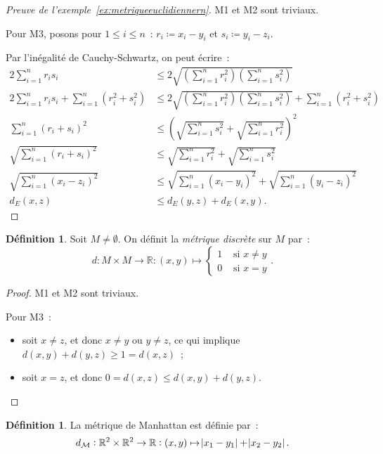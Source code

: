 \documentclass{report}
\theoremstyle{definition}
\newtheorem{déf}[thm]{Définition}
\theoremstyle{remark}
\newcommand{\R}{\mathbb R}
\begin{document}
		\begin{proof}[Preuve de l'exemple~\ref{ex:metriqueeuclidiennern}] M1 et M2 sont triviaux.

		Pour M3, posons pour $1 \leq i \leq n$~: $r_i \coloneqq x_i - y_i$ et $s_i \coloneqq y_i - z_i$.

		Par l'inégalité de Cauchy-Schwartz, on peut écrire~:
		\begin{align*}
			2\sum_{i=1}^nr_is_i &\leq 2\sqrt {\left(\sum_{i=1}^nr_i^2\right)\left(\sum_{i=1}^ns_i^2\right)} \\
			2\sum_{i=1}^nr_is_i + \sum_{i=1}^n(r_i^2+s_i^2) &\leq 2\sqrt{\left(\sum_{i=1}^nr_i^2\right)\left(\sum_{i=1}^ns_i^2\right)} + \sum_{i=1}^n(r_i^2+s_i^2) \\
			\sum_{i=1}^n(r_i+s_i)^2 &\leq \left(\sqrt {\sum_{i=1}^ns_i^2} + \sqrt {\sum_{i=1}^nr_i^2}\right)^2 \\
			\sqrt {\sum_{i=1}^n(r_i+s_i)^2} &\leq \sqrt {\sum_{i=1}^nr_i^2} + \sqrt {\sum_{i=1}^ns_i^2} \\
			\sqrt {\sum_{i=1}^n(x_i-z_i)^2} &\leq \sqrt {\sum_{i=1}^n(x_i-y_i)^2} + \sqrt {\sum_{i=1}^n(y_i-z_i)^2} \\
			d_E(x, z) &\leq d_E(y, z) + d_E(x, y).
		\end{align*}
		\end{proof}

		\begin{déf}\label{déf:métriquediscrète} Soit $M \neq \emptyset$. On définit la \textit{métrique discrète} sur $M$ par~:
		\[d : M \times M \to \R : (x, y) \mapsto \begin{cases} 1 &\text{ si } x \neq y \\ 0 &\text{ si } x = y \end{cases}.\]
		\end{déf}

		\begin{proof} M1 et M2 sont triviaux.

		Pour M3~:
		\begin{itemize}
			\item soit $x \neq z$, et donc $x \neq y$ ou $y \neq z$, ce qui implique $d(x, y) + d(y, z) \geq 1 = d(x, z)$~;
			\item soit $x = z$, et donc $0 = d(x, z) \leq d(x, y) + d(y, z)$.
		\end{itemize}
		\end{proof}

		\begin{déf} La métrique de Manhattan est définie par~:
		\[d_{\mathcal M} : \R^2 \times \R^2 \to \R : (x, y) \mapsto \abs {x_1 - y_1} + \abs {x_2 - y_2}.\]
		\end{déf}
\end{document}
